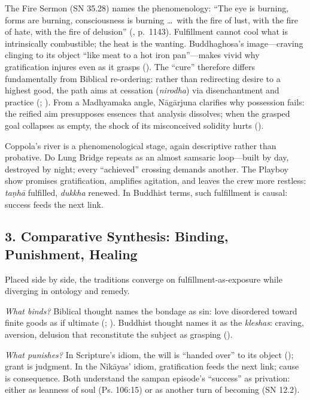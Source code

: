 The Fire Sermon (SN 35.28) names the phenomenology: ``The eye is burning, forms are burning, consciousness is burning \ldots\ with the fire of lust, with the fire of hate, with the fire of delusion'' (\parencite{BodhiSN2000}, p.~1143). Fulfillment cannot cool what is intrinsically combustible; the heat is the wanting. Buddhaghosa’s image---craving clinging to its object ``like meat to a hot iron pan''---makes vivid why gratification injures even as it grasps (\parencite{BuddhaghosaVisuddhi1956}). The ``cure'' therefore differs fundamentally from Biblical re-ordering: rather than redirecting desire to a highest good, the path aims at cessation (\emph{nirodha}) via disenchantment and practice (\parencite{Rahula1959}; \parencite{Gethin1998}). From a Madhyamaka angle, Nāgārjuna clarifies why possession fails: the reified aim presupposes essences that analysis dissolves; when the grasped goal collapses as empty, the shock of its misconceived solidity hurts (\parencite{NagarjunaMMK2013}).

Coppola’s river is a phenomenological stage, again descriptive rather than probative. Do Lung Bridge repeats as an almost samsaric loop---built by day, destroyed by night; every ``achieved'' crossing demands another. The Playboy show promises gratification, amplifies agitation, and leaves the crew more restless: \emph{taṇhā} fulfilled, \emph{dukkha} renewed. In Buddhist terms, such fulfillment is causal: success feeds the next link.

\subsection*{3. Comparative Synthesis: Binding, Punishment, Healing}
\label{ssec:3-comparative-synthesis-binding-punishment-healing}

Placed side by side, the traditions converge on fulfillment-as-exposure while diverging in ontology and remedy.

\emph{What binds?} Biblical thought names the bondage as sin: love disordered toward finite goods as if ultimate (\parencite{AugustineConfessions1998}; \parencite{AquinasST1947}). Buddhist thought names it as the \emph{kleshas}: craving, aversion, delusion that reconstitute the subject as grasping (\parencite{BodhiSN2000}).

\emph{What punishes?} In Scripture’s idiom, the will is ``handed over'' to its object (\parencite{FitzmyerRomans1993}); grant is judgment. In the Nikāyas’ idiom, gratification feeds the next link; cause is consequence. Both understand the sampan episode’s ``success'' as privation: either as leanness of soul (Ps. 106:15) or as another turn of becoming (SN 12.2).

